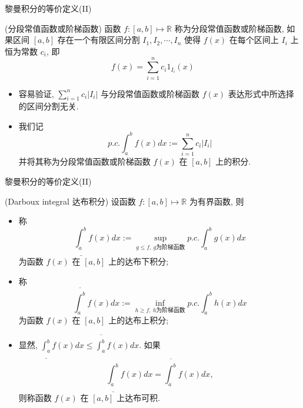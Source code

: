 \documentclass[Prob-All.tex]{subfiles}
\begin{document}
\begin{frame}{黎曼积分的等价定义(II)}
	\begin{defi} (分段常值函数或阶梯函数) 函数 $f:[a,b]\mapsto \mathbb{R}$ 称为分段常值函数或阶梯函数, 如果区间 $[a,b]$ 存在一个有限区间分割 $I_1, I_2,\cdots, I_n$ 使得 $f(x)$ 在每个区间上 $I_i$ 上恒为常数 $c_i$, 即
		\[f(x)=\sum_{i=1}^{n}c_i1_{I_i}(x)\]
	\end{defi}
	\pause
	\begin{rmk}
		\begin{itemize}[<+-|alert@+>]
			\item 容易验证, $\sum_{i=1}^nc_i|I_i|$ 与分段常值函数或阶梯函数 $f(x)$ 表达形式中所选择的区间分割无关.%
			\item 我们记
			\[p.c.\int_a^bf(x)dx:=\sum_{i=1}^nc_i|I_i|\]
			并将其称为分段常值函数或阶梯函数 $f(x)$ 在 $[a,b]$ 上的积分.
		\end{itemize}
	\end{rmk}
\end{frame}
\begin{frame}{黎曼积分的等价定义(II)}
	\begin{defi} ({\rm Darboux integral} 达布积分) 设函数 $f:[a,b]\mapsto \mathbb{R}$ 为有界函数, 则
		\begin{itemize}[<+-|alert@+>]
			\item 称\[\underline{\int_a^b}f(x)dx:=\sup_{g\leq f,\  g\mbox{为阶梯函数}}p.c.\int_a^bg(x)dx\]
			为函数 $f(x)$ 在 $[a,b]$ 上的达布下积分;%
			\item 称\[\overline{\int_a^b}f(x)dx:=\inf_{h\geq f,\  h\mbox{为阶梯函数}}p.c.\int_a^bh(x)dx\]
			为函数 $f(x)$ 在 $[a,b]$ 上的达布上积分;
			\item 显然, $\underline{\int_a^b}f(x)dx\leq \overline{\int_a^b}f(x)dx$. 如果
			\[\underline{\int_a^b}f(x)dx=\overline{\int_a^b}f(x)dx,\]
			则称函数 $f(x)$ 在 $[a,b]$ 上达布可积.
		\end{itemize}
	\end{defi}

\end{frame}
\end{document}
